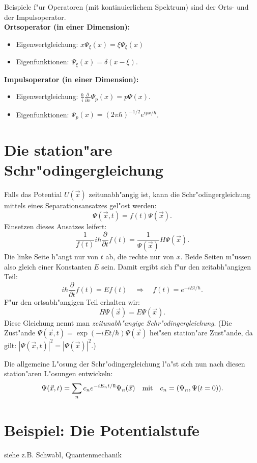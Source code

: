 Beispiele f"ur Operatoren (mit kontinuierlichem Spektrum) sind 
der Orts- und der Impulsoperator.\\
\textbf{Ortsoperator (in einer Dimension):} 
\begin{itemize}
	\item Eigenwertgleichung: $x\Psi_{\xi}(x)=\xi \Psi_{\xi}(x)$
	\item Eigenfunktionen: $\Psi_{\xi}(x) = \delta(x-\xi)$.
\end{itemize}
\textbf{Impulsoperator (in einer Dimension):}
\begin{itemize}
	\item Eigenwertgleichung: $\frac{\hbar}{i} \frac{\partial}{\partial x}
		\Psi_p(x) = p \Psi(x)$.
	\item Eigenfunktionen: $\Psi_p(x) = (2 \pi \hbar)^{-1/2}
		e^{ipx/\hbar}$.
\end{itemize}



\section{Die station"are Schr"odingergleichung}

Falls das Potential $U(\vec x)$ zeitunabh"angig ist, kann die 
Schr"odingergleichung mittels eines Separationsansatzes gel"ost werden:
\begin{equation}
	\Psi(\vec x,t) = f(t)\Psi(\vec x).
\end{equation}
Einsetzen dieses Ansatzes leifert: 
\begin{equation}
	\frac{1}{f(t)}i\hbar \frac{\partial}{\partial t} f(t)
	= \frac{1}{\Psi(\vec x)}H\Psi(\vec x).
\end{equation}
Die linke Seite h"angt nur von $t$ ab, die rechte nur von $x$. Beide
Seiten m"ussen also gleich einer Konstanten $E$ sein. Damit ergibt
sich f"ur den zeitabh"angigen Teil:
\begin{equation}
	i\hbar \frac{\partial}{\partial t}f(t)=E f(t)
	\quad \Rightarrow \quad f(t)=e^{-iEt/\hbar}.
\end{equation} 
F"ur den ortsabh"angigen Teil erhalten wir:
\begin{equation}
	H\Psi(\vec x) = E\Psi(\vec x).
\end{equation}
Diese Gleichung nennt man \emph{zeitunabh"angige Schr"odingergleichung}.
(Die Zust"ande $\Psi(\vec x,t) = \exp{(-iEt/\hbar)}\Psi(\vec x)$ 
hei"sen station"are Zust"ande, da gilt: 
$|\Psi(\vec x,t)|^2=|\Psi(\vec x)|^2$.)

Die allgemeine L"osung der Schr"odingergleichung l"a"st sich nun nach
diesen station"aren L"osungen entwickeln:
\begin{equation}
	\Psi(\vec x,t) = \sum \limits_{n} c_n e^{-iE_nt/\hbar}\Psi_n(\vec x)
	\quad \textnormal{mit} \quad c_n = (\Psi_n,\Psi(t=0)).
\end{equation}


\section{Beispiel: Die Potentialstufe}

siehe z.B. Schwabl, Quantenmechanik


